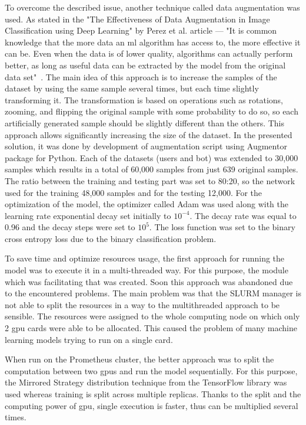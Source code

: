 To overcome the described issue, another technique called data augmentation was used.
As stated in the "The Effectiveness of Data Augmentation in Image Classification using Deep Learning" by Perez et al. article --- "It is common knowledge that the more data an \gls{ml} algorithm has access to, the more effective it can be.
Even when the data is of lower quality, algorithms can actually perform better, as long as useful data can be extracted by the model from the original data set"~\cite{augmentation}.
The main idea of this approach is to increase the samples of the dataset by using the same sample several times, but each time slightly transforming it.
The transformation is based on operations such as rotations, zooming, and flipping the original sample with some probability to do so, so each artificially generated sample should be slightly different than the others.
This approach allows significantly increasing the size of the dataset.
In the presented solution, it was done by development of augmentation script using Augmentor package for Python.
Each of the datasets (users and bot) was extended to 30,000 samples which results in a total of 60,000 samples from just 639 original samples.
The ratio between the training and testing part was set to 80:20, so the network used for the training 48,000 samples and for the testing 12,000.
For the optimization of the model, the optimizer called Adam was used along with the learning rate exponential decay set initially to $10^{-4}$.
The decay rate was equal to 0.96 and the decay steps were set to $10^{5}$.
The loss function was set to the binary cross entropy loss due to the binary classification problem.

To save time and optimize resources usage, the first approach for running the model was to execute it in a multi-threaded way.
For this purpose, the module which was facilitating that was created.
Soon this approach was abandoned due to the encountered problems.
The main problem was that the SLURM manager is not able to split the resources in a way to the multithreaded approach to be sensible.
The resources were assigned to the whole computing node on which only 2 \gls{gpu} cards were able to be allocated.
This caused the problem of many machine learning models trying to run on a single card.

When run on the Prometheus cluster, the better approach was to split the computation between two \gls{gpu}s and run the model sequentially.
For this purpose, the Mirrored Strategy distribution technique from the TensorFlow library was used whereas training is split across multiple replicas.
Thanks to the split and the computing power of \gls{gpu}, single execution is faster, thus can be multiplied several times.
